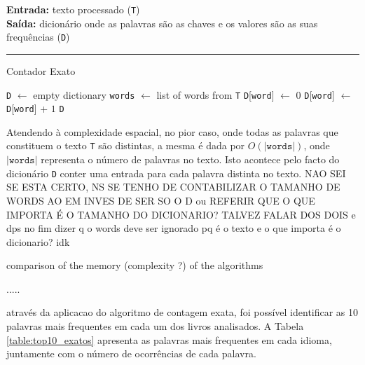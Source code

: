 \documentclass[mirror, portugues]{revdetua}
\begin{document}
\begin{algorithm}[H]
\raggedright
\textbf{Entrada:} texto processado (\texttt{T}) \\
\textbf{Saída:} dicionário onde as palavras são as chaves e os valores são as suas frequências (\texttt{D})\\
\hrule 
\caption{Contador Exato}
\begin{algorithmic}[1]
    \State \texttt{D} $\gets$ empty dictionary
    \State \texttt{words} $\gets$ list of words from \texttt{T}
            \State \texttt{D}[\texttt{word}] $\gets$ 0
        \EndIf
        \State \texttt{D}[\texttt{word}] $\gets$ \texttt{D}[\texttt{word}] + $1$
    \EndFor
    \State \Return \texttt{D}
\end{algorithmic}
\end{algorithm}
    
Atendendo à complexidade espacial, no pior caso, onde todas as palavras que constituem o texto \texttt{T} são distintas, a mesma é dada por $O(|\texttt{words}|)$, onde $|\texttt{words}|$ representa o número de palavras no texto. Isto acontece pelo facto do dicionário \texttt{D} conter uma entrada para cada palavra distinta no texto. NAO SEI SE ESTA CERTO, NS SE TENHO DE CONTABILIZAR O TAMANHO DE WORDS AO EM INVES DE SER SO O D ou REFERIR QUE O QUE IMPORTA É O TAMANHO DO DICIONARIO? TALVEZ FALAR DOS DOIS e dps no fim dizer q o words deve ser ignorado pq é o texto e o que importa é o dicionario? idk

comparison of the memory (complexity ?) of the algorithms

.....

através da aplicacao do algoritmo de contagem exata, foi possível identificar as 10 palavras mais frequentes em cada um dos livros analisados. A Tabela \ref{table:top10_exatos} apresenta as palavras mais frequentes em cada idioma, juntamente com o número de ocorrências de cada palavra.
\end{document}
